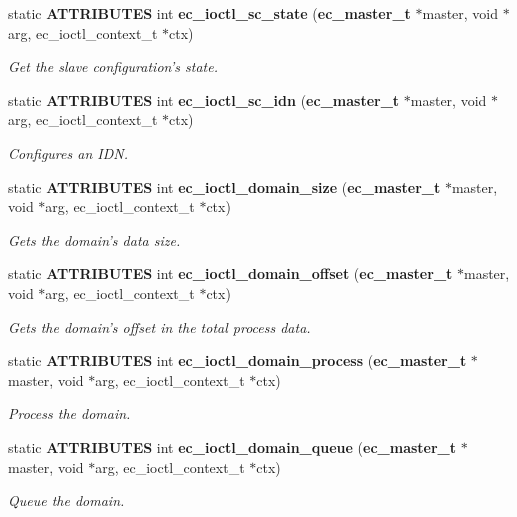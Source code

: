 \begin{DoxyCompactItemize}
static {\bf \-A\-T\-T\-R\-I\-B\-U\-T\-E\-S} int {\bf ec\-\_\-ioctl\-\_\-sc\-\_\-state} ({\bf ec\-\_\-master\-\_\-t} $\ast$master, void $\ast$arg, ec\-\_\-ioctl\-\_\-context\-\_\-t $\ast$ctx)
\begin{DoxyCompactList}\small\item\em \-Get the slave configuration's state. \end{DoxyCompactList}\item 
static {\bf \-A\-T\-T\-R\-I\-B\-U\-T\-E\-S} int {\bf ec\-\_\-ioctl\-\_\-sc\-\_\-idn} ({\bf ec\-\_\-master\-\_\-t} $\ast$master, void $\ast$arg, ec\-\_\-ioctl\-\_\-context\-\_\-t $\ast$ctx)
\begin{DoxyCompactList}\small\item\em \-Configures an \-I\-D\-N. \end{DoxyCompactList}\item 
static {\bf \-A\-T\-T\-R\-I\-B\-U\-T\-E\-S} int {\bf ec\-\_\-ioctl\-\_\-domain\-\_\-size} ({\bf ec\-\_\-master\-\_\-t} $\ast$master, void $\ast$arg, ec\-\_\-ioctl\-\_\-context\-\_\-t $\ast$ctx)
\begin{DoxyCompactList}\small\item\em \-Gets the domain's data size. \end{DoxyCompactList}\item 
static {\bf \-A\-T\-T\-R\-I\-B\-U\-T\-E\-S} int {\bf ec\-\_\-ioctl\-\_\-domain\-\_\-offset} ({\bf ec\-\_\-master\-\_\-t} $\ast$master, void $\ast$arg, ec\-\_\-ioctl\-\_\-context\-\_\-t $\ast$ctx)
\begin{DoxyCompactList}\small\item\em \-Gets the domain's offset in the total process data. \end{DoxyCompactList}\item 
static {\bf \-A\-T\-T\-R\-I\-B\-U\-T\-E\-S} int {\bf ec\-\_\-ioctl\-\_\-domain\-\_\-process} ({\bf ec\-\_\-master\-\_\-t} $\ast$master, void $\ast$arg, ec\-\_\-ioctl\-\_\-context\-\_\-t $\ast$ctx)
\begin{DoxyCompactList}\small\item\em \-Process the domain. \end{DoxyCompactList}\item 
static {\bf \-A\-T\-T\-R\-I\-B\-U\-T\-E\-S} int {\bf ec\-\_\-ioctl\-\_\-domain\-\_\-queue} ({\bf ec\-\_\-master\-\_\-t} $\ast$master, void $\ast$arg, ec\-\_\-ioctl\-\_\-context\-\_\-t $\ast$ctx)
\begin{DoxyCompactList}\small\item\em \-Queue the domain. \end{DoxyCompactList}\item 

\end{DoxyCompactItemize}
